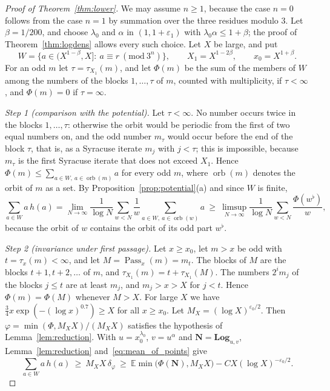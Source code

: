 \documentclass[12pt]{amsart}
\theoremstyle{definition}
\theoremstyle{remark}
\begin{document}
\begin{proof}[Proof of Theorem~\ref{thm:lower}]
We may assume $n\ge1$, because the case $n=0$ follows from the case $n=1$ by summation over the three residues modulo $3$. Let $\beta=1/200$, and choose $\lambda_0$ and $\alpha$ in $(1,1+\varepsilon_1)$ with $\lambda_0\alpha\le1+\beta$; the proof of Theorem~\ref{thm:logdens} allows every such choice. Let $X$ be large, and put
\[
W=\{a\in(X^{1-\beta},X]:\ a\equiv r\ (\mathrm{mod}\ 3^n)\},\qquad X_1=X^{1-2\beta},\qquad x_0=X^{1+\beta}.
\]
For an odd $m$ let $\tau=\tau_{X_1}(m)$, and let $\Phi(m)$ be the sum of the members of $W$ among the numbers of the blocks $1,\ldots,\tau$ of $m$, counted with multiplicity, if $\tau<\infty$, and $\Phi(m)=0$ if $\tau=\infty$.

\emph{Step 1 (comparison with the potential).} Let $\tau<\infty$. No number occurs twice in the blocks $1,\ldots,\tau$: otherwise the orbit would be periodic from the first of two equal numbers on, and the odd number $m_\tau$ would occur before the end of the block $\tau$, that is, as a Syracuse iterate $m_j$ with $j<\tau$; this is impossible, because $m_\tau$ is the first Syracuse iterate that does not exceed $X_1$. Hence $\Phi(m)\le\sum_{a\in W,\ a\in\operatorname{orb}(m)}a$ for every odd $m$, where $\operatorname{orb}(m)$ denotes the orbit of $m$ as a set. By Proposition~\ref{prop:potential}(a) and since $W$ is finite,
\begin{equation}
\label{eq:mean_of_points}
\sum_{a\in W}a\,h(a)=\lim_{N\to\infty}\frac1{\log N}\sum_{w<N}\frac1w\sum_{a\in W,\ a\in\operatorname{orb}(w)}a\ \ge\ \limsup_{N\to\infty}\frac1{\log N}\sum_{w<N}\frac{\Phi(w^\flat)}w,
\end{equation}
because the orbit of $w$ contains the orbit of its odd part $w^\flat$.

\emph{Step 2 (invariance under first passage).} Let $x\ge x_0$, let $m>x$ be odd with $t=\tau_x(m)<\infty$, and let $M=\operatorname{Pass}_x(m)=m_t$. The blocks of $M$ are the blocks $t+1,t+2,\ldots$ of $m$, and $\tau_{X_1}(m)=t+\tau_{X_1}(M)$. The numbers $2^im_j$ of the blocks $j\le t$ are at least $m_j$, and $m_j>x>X$ for $j<t$. Hence $\Phi(m)=\Phi(M)$ whenever $M>X$. For large $X$ we have $\tfrac34x\exp(-(\log x)^{0.7})\ge X$ for all $x\ge x_0$. Let $M_X=(\log X)^{\varepsilon_0/2}$. Then $\varphi=\min(\Phi,M_XX)/(M_XX)$ satisfies the hypothesis of Lemma~\ref{lem:reduction}. With $u=x_0^{\lambda_0}$, $v=u^\alpha$ and $\mathbf N=\mathbf{Log}_{u,v}$, Lemma~\ref{lem:reduction} and~\eqref{eq:mean_of_points} give
\begin{equation}
\label{eq:reduced}
\sum_{a\in W}a\,h(a)\ \ge\ M_XX\,\delta_\varphi\ \ge\ \mathbb E\min\bigl(\Phi(\mathbf N),M_XX\bigr)-CX(\log X)^{-\varepsilon_0/2}.
\end{equation}


\end{proof}
\end{document}
